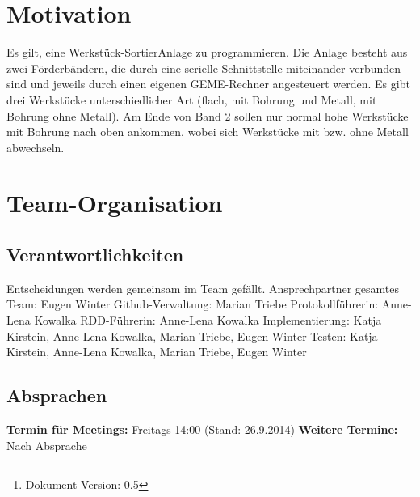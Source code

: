 \documentclass[oneside,a4paper,titlepage]{scrartcl} %
\begin{document}
\date{\today\thanks{Dokument-Version: 0.5}} %
\maketitle
\setcounter{page}{1}

\tableofcontents

\newpage

\section{Motivation}
Es gilt, eine Werkstück-SortierAnlage zu programmieren. Die Anlage besteht aus zwei
Förderbändern, die durch eine serielle Schnittstelle miteinander verbunden sind und jeweils durch
einen eigenen GEME-Rechner angesteuert werden.
Es gibt drei Werkstücke unterschiedlicher Art (flach, mit Bohrung und Metall, mit Bohrung ohne
Metall). Am Ende von Band 2 sollen nur normal hohe Werkstücke mit Bohrung nach oben
ankommen, wobei sich Werkstücke mit bzw. ohne Metall abwechseln.

\section{Team-Organisation}

\subsection{Verantwortlichkeiten}
Entscheidungen werden gemeinsam im Team gefällt.\newline
Ansprechpartner gesamtes Team: Eugen Winter\newline
Github-Verwaltung: Marian Triebe\newline
Protokollführerin: Anne-Lena Kowalka\newline
RDD-Führerin: Anne-Lena Kowalka\newline
Implementierung: Katja Kirstein, Anne-Lena Kowalka, Marian Triebe, Eugen Winter\newline
Testen: Katja Kirstein, Anne-Lena Kowalka, Marian Triebe, Eugen Winter\newline

\subsection{Absprachen}
\textbf{Termin für Meetings:} Freitags 14:00 (Stand: 26.9.2014)\newline
\textbf{Weitere Termine:} Nach Absprache
\end{document}
